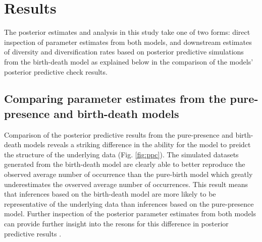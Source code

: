 \documentclass[12pt,letterpaper]{article}
\begin{document}
\section*{Results}

The posterior estimates and analysis in this study take one of two forms: direct inspection of parameter estimates from both models, and downstream estimates of diversity and diversification rates based on posterior predictive simulations from the birth-death model as explained below in the comparison of the models' posterior predictive check results.

\subsection*{Comparing parameter estimates from the pure-presence and birth-death models}


Comparison of the posterior predictive results from the pure-presence and birth-death models reveals a striking difference in the ability for the model to preidct the structure of the underlying data (Fig. \ref{fig:ppc}). The simulated datasets generated from the birth-death model are clearly able to better reproduce the observed average number of occurrence than the pure-birth model which greatly underestimates the ovserved average number of occurrences. This result means that inferences based on the birth-death model are more likely to be representative of the underlying data than inferences based on the pure-presence model. Further inspection of the posterior parameter estimates from both models can provide further insight into the resons for this difference in posterior predictive results \citep{Gelman2013d}. 
\end{document}
